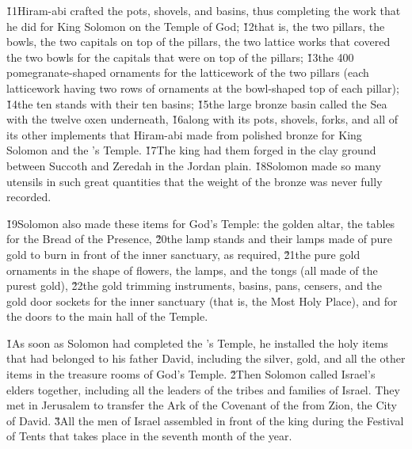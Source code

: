 \v{11}Hiram-abi crafted the pots, shovels, and basins, thus completing the work that he did for King Solomon on the Temple of God; \v{12}that is, the two pillars, the bowls, the two capitals on top of the pillars, the two lattice works that covered the two bowls for the capitals that were on top of the pillars; \v{13}the 400 pomegranate-shaped ornaments for the latticework of the two pillars (each latticework having two rows of ornaments at the bowl-shaped top of each pillar); \v{14}the ten stands with their ten basins; \v{15}the large bronze basin called the Sea with the twelve oxen underneath, \v{16}along with its pots, shovels, forks, and all of its other implements that Hiram-abi made from polished bronze for King Solomon and the 's Temple. \v{17}The king had them forged in the clay ground between Succoth and Zeredah in the Jordan plain. \v{18}Solomon made so many utensils in such great quantities that the weight of the bronze was never fully recorded.

\v{19}Solomon also made these items for God's Temple: the golden altar, the tables for the Bread of the Presence, \v{20}the lamp stands and their lamps made of pure gold to burn in front of the inner sanctuary, as required, \v{21}the pure gold ornaments in the shape of flowers, the lamps, and the tongs (all made of the purest gold), \v{22}the gold trimming instruments, basins, pans, censers, and the gold door sockets for the inner sanctuary (that is, the Most Holy Place), and for the doors to the main hall of the Temple.

\v{1}As soon as Solomon had completed the 's Temple, he installed the holy items that had belonged to his father David, including the silver, gold, and all the other items in the treasure rooms of God's Temple. \v{2}Then Solomon called Israel's elders together, including all the leaders of the tribes and families of Israel. They met in Jerusalem to transfer the Ark of the Covenant of the  from Zion, the City of David. \v{3}All the men of Israel assembled in front of the king during the Festival of Tents that takes place in the seventh month of the year.

